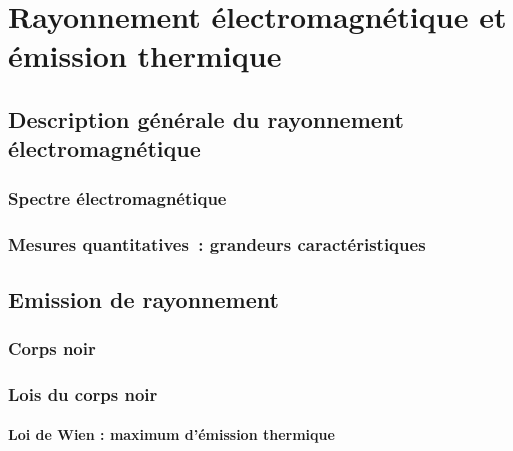 \chapter{Rayonnement électromagnétique et émission thermique} \label{chap:rad} 

		

\mk \section{Description générale du rayonnement électromagnétique}

	\sk \subsection{Spectre électromagnétique}

		

	\sk \subsection{Mesures quantitatives~: grandeurs caractéristiques}

		

\mk \section{Emission de rayonnement} \label{corpsnoir}

		

	\sk \subsection{Corps noir}

		
		
		

	\sk \subsection{Lois du corps noir}

		\sk \subsubsection{Loi de Wien : maximum d'émission thermique}


